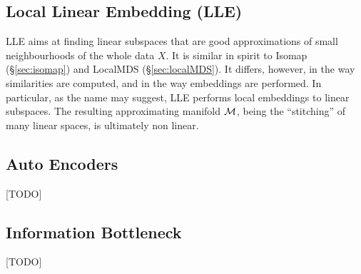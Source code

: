 \subsection{Local Linear Embedding (LLE)}
\label{sec:lle}


LLE aims at finding linear subspaces that are good approximations of small neighbourhoods of the whole data $X$.
It is similar in spirit to Isomap (\S\ref{sec:isomap}) and LocalMDS (\S\ref{sec:localMDS}).
It differs, however, in the way similarities are computed, and in the way embeddings are performed. 
In particular, as the name may suggest, LLE performs local embeddings to linear subspaces. The resulting approximating manifold $\mathcal{M}$, being the ``stitching'' of many linear spaces, is ultimately non linear.




\subsection{Auto Encoders}
\label{sec:auto_encoders}
[TODO]



\subsection{Information Bottleneck}
[TODO]

%
%
%


